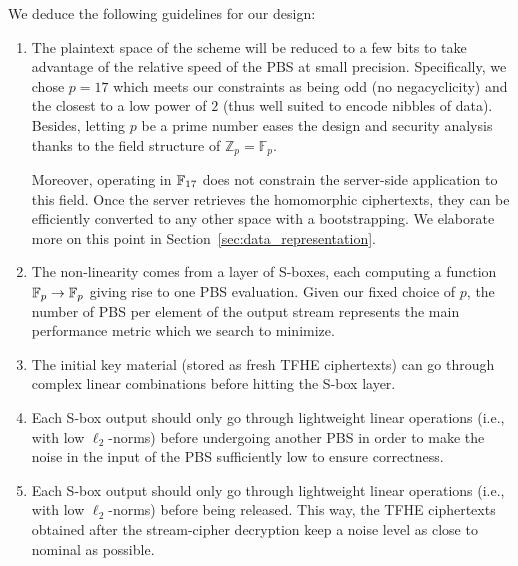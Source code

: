 We deduce the following guidelines for our design:
\begin{enumerate}
\item The plaintext space of the scheme will be reduced to a few bits to take advantage of the relative speed of the \gls{PBS} at small precision. Specifically, we chose $p=17$ which meets our constraints as being odd (no negacyclicity) and the closest to a low power of $2$ (thus well suited to encode nibbles of data). Besides, letting $p$ be a prime number eases the design and security analysis thanks to the field structure of $\mathbb{Z}_p = \mathbb{F}_p$.
  
Moreover, operating in $\mathbb{F}_{17}$ does not constrain the server-side application to this field. Once the server retrieves the homomorphic ciphertexts, they can be efficiently converted to any other space with a bootstrapping. We elaborate more on this point in Section~\ref{sec:data_representation}. 


  \item The non-linearity comes from a layer of \gls{S-box}es, each computing a function $\mathbb{F}_{p} \to \mathbb{F}_{p}$  giving rise to one \gls{PBS} evaluation. Given our fixed choice of $p$, the number of \gls{PBS} per element of the output stream represents the main performance metric which we search to minimize. 

  
  \item The initial key material (stored as fresh \gls{TFHE} ciphertexts) can go through complex linear combinations
  before hitting the \gls{S-box} layer.
  
  \item Each \gls{S-box} output should only go through lightweight linear operations (i.e., with low $\ell_2$-norms) before undergoing another \gls{PBS} in order to make the noise in the input of the \gls{PBS} sufficiently low to ensure correctness.

  
  \item Each \gls{S-box} output should only go through lightweight linear operations (i.e., with low $\ell_2$-norms) before being
  released. This way, the \gls{TFHE} ciphertexts obtained after the stream-cipher decryption keep a noise level as close to nominal as possible.
\end{enumerate}